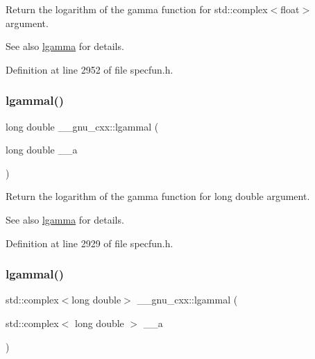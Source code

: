 Return the logarithm of the gamma function for {\ttfamily  std\+::complex$<$float$>$ } argument.

\begin{DoxySeeAlso}{See also}
\hyperlink{group__gnu__math__spec__func_ga40fa5127f7c419ed1d8f1c6a6f96ea9b}{lgamma} for details. 
\end{DoxySeeAlso}


Definition at line 2952 of file specfun.\+h.

\mbox{\label{group__gnu__math__spec__func_gabc66f234f4554cd5ff878792cc85bd37}} 
\subsubsection{\texorpdfstring{lgammal()}{lgammal()}\hspace{0.1cm}{\footnotesize\ttfamily [1/2]}}
{\footnotesize\ttfamily long double \+\_\+\+\_\+gnu\+\_\+cxx\+::lgammal (\begin{DoxyParamCaption}\item[{long double}]{\+\_\+\+\_\+a }\end{DoxyParamCaption})\hspace{0.3cm}{\ttfamily [inline]}}

Return the logarithm of the gamma function for {\ttfamily  long double } argument.

\begin{DoxySeeAlso}{See also}
\hyperlink{group__gnu__math__spec__func_ga40fa5127f7c419ed1d8f1c6a6f96ea9b}{lgamma} for details. 
\end{DoxySeeAlso}


Definition at line 2929 of file specfun.\+h.

\mbox{\label{group__gnu__math__spec__func_ga5f12f60afe9a47f4ca04964f642bbf0d}} 
\subsubsection{\texorpdfstring{lgammal()}{lgammal()}\hspace{0.1cm}{\footnotesize\ttfamily [2/2]}}
{\footnotesize\ttfamily std\+::complex$<$long double$>$ \+\_\+\+\_\+gnu\+\_\+cxx\+::lgammal (\begin{DoxyParamCaption}\item[{std\+::complex$<$ long double $>$}]{\+\_\+\+\_\+a }\end{DoxyParamCaption})\hspace{0.3cm}{\ttfamily [inline]}}

